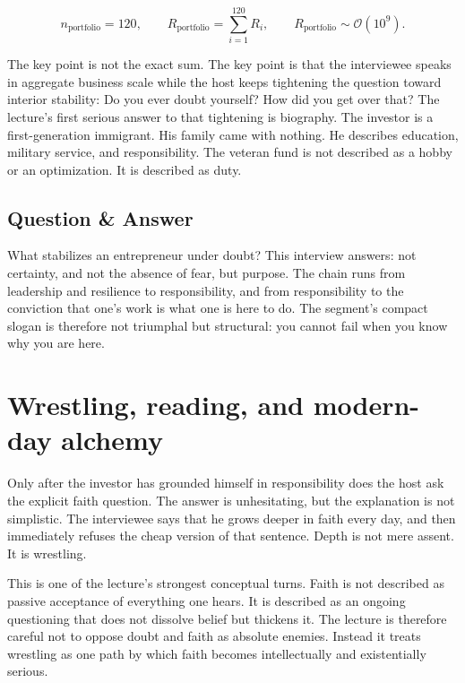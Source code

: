 \begin{equation}
n_{\text{portfolio}} = 120, \qquad
R_{\text{portfolio}} = \sum_{i=1}^{120} R_i, \qquad
R_{\text{portfolio}} \sim \mathcal{O}(10^9).
\end{equation}

The key point is not the exact sum. The key point is that the interviewee speaks in aggregate business scale while the host keeps tightening the question toward interior stability: Do you ever doubt yourself? How did you get over that? The lecture's first serious answer to that tightening is biography. The investor is a first-generation immigrant. His family came with nothing. He describes education, military service, and responsibility. The veteran fund is not described as a hobby or an optimization. It is described as duty.

\subsection{Question \& Answer}

What stabilizes an entrepreneur under doubt? This interview answers: not certainty, and not the absence of fear, but purpose. The chain runs from leadership and resilience to responsibility, and from responsibility to the conviction that one's work is what one is here to do. The segment's compact slogan is therefore not triumphal but structural: you cannot fail when you know why you are here.

\section{Wrestling, reading, and modern-day alchemy}

Only after the investor has grounded himself in responsibility does the host ask the explicit faith question. The answer is unhesitating, but the explanation is not simplistic. The interviewee says that he grows deeper in faith every day, and then immediately refuses the cheap version of that sentence. Depth is not mere assent. It is wrestling.

This is one of the lecture's strongest conceptual turns. Faith is not described as passive acceptance of everything one hears. It is described as an ongoing questioning that does not dissolve belief but thickens it. The lecture is therefore careful not to oppose doubt and faith as absolute enemies. Instead it treats wrestling as one path by which faith becomes intellectually and existentially serious.

